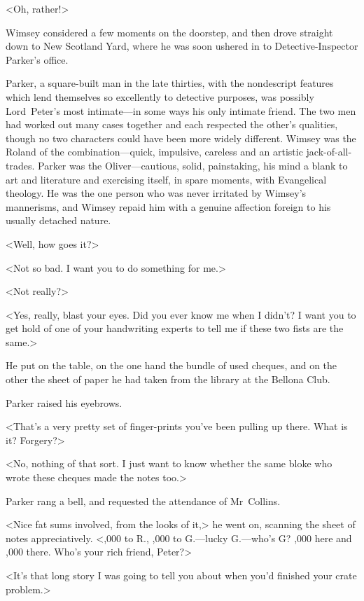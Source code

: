 <Oh, rather!>

Wimsey considered a few moments on the doorstep, and then drove straight down to New Scotland Yard, where he was soon ushered in to Detective-Inspector Parker's office.

Parker, a square-built man in the late thirties, with the nondescript features which lend themselves so excellently to detective purposes, was possibly Lord~Peter's most intimate—in some ways his only intimate friend. The two men had worked out many cases together and each respected the other's qualities, though no two characters could have been more widely different. Wimsey was the Roland of the combination—quick, impulsive, careless and an artistic jack-of-all-trades. Parker was the Oliver—cautious, solid, painstaking, his mind a blank to art and literature and exercising itself, in spare moments, with Evangelical theology. He was the one person who was never irritated by Wimsey's mannerisms, and Wimsey repaid him with a genuine affection foreign to his usually detached nature.

<Well, how goes it?>

<Not so bad. I want you to do something for me.>

<Not really?>

<Yes, really, blast your eyes. Did you ever know me when I didn't? I want you to get hold of one of your handwriting experts to tell me if these two fists are the same.>

He put on the table, on the one hand the bundle of used cheques, and on the other the sheet of paper he had taken from the library at the Bellona Club.

Parker raised his eyebrows.

<That's a very pretty set of finger-prints you've been pulling up there. What is it? Forgery?>

<No, nothing of that sort. I just want to know whether the same bloke who wrote these cheques made the notes too.>

Parker rang a bell, and requested the attendance of Mr~Collins.

<Nice fat sums involved, from the looks of it,> he went on, scanning the sheet of notes appreciatively. <,000 to R\@., ,000 to G\@.—lucky G\@.—who's G\@? ,000 here and ,000 there. Who's your rich friend, Peter?>

<It's that long story I was going to tell you about when you'd finished your crate problem.>

